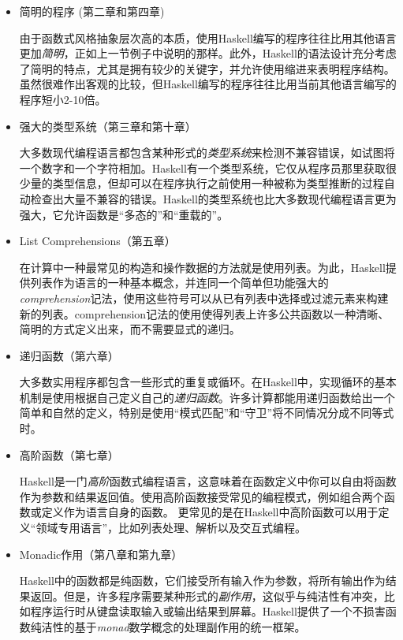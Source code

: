 \begin{itemize}
\item 简明的程序 (第二章和第四章)

由于函数式风格抽象层次高的本质，使用Haskell编写的程序往往比用其他语言更加\textit{简明}，正如上一节例子中说明的那样。此外，Haskell的语法设计充分考虑了简明的特点，尤其是拥有较少的关键字，并允许使用缩进来表明程序结构。虽然很难作出客观的比较，但Haskell编写的程序往往比用当前其他语言编写的程序短小2-10倍。

\item 强大的类型系统（第三章和第十章）

大多数现代编程语言都包含某种形式的\textit{类型系统}来检测不兼容错误，如试图将一个数字和一个字符相加。Haskell有一个类型系统，它仅从程序员那里获取很少量的类型信息，但却可以在程序执行之前使用一种被称为类型推断的过程自动检查出大量不兼容的错误。Haskell的类型系统也比大多数现代编程语言更为强大，它允许函数是“多态的”和“重载的”。

\item List Comprehensions（第五章）

在计算中一种最常见的构造和操作数据的方法就是使用列表。为此，Haskell提供列表作为语言的一种基本概念，并连同一个简单但功能强大的\textit{comprehension}记法，使用这些符号可以从已有列表中选择或过滤元素来构建新的列表。comprehension记法的使用使得列表上许多公共函数以一种清晰、简明的方式定义出来，而不需要显式的递归。

\item 递归函数（第六章）

大多数实用程序都包含一些形式的重复或循环。在Haskell中，实现循环的基本机制是使用根据自己定义自己的\textit{递归函数}。许多计算都能用递归函数给出一个简单和自然的定义，特别是使用“模式匹配”和“守卫”将不同情况分成不同等式时。

\item 高阶函数（第七章）

Haskell是一门\textit{高阶}函数式编程语言，这意味着在函数定义中你可以自由将函数作为参数和结果返回值。使用高阶函数接受常见的编程模式，例如组合两个函数或定义作为语言自身的函数。
更常见的是在Haskell中高阶函数可以用于定义“领域专用语言”，比如列表处理、解析以及交互式编程。

\item Monadic作用（第八章和第九章）

Haskell中的函数都是纯函数，它们接受所有输入作为参数，将所有输出作为结果返回。但是，许多程序需要某种形式的\textit{副作用}，这似乎与纯洁性有冲突，比如程序运行时从键盘读取输入或输出结果到屏幕。Haskell提供了一个不损害函数纯洁性的基于\textit{monad}数学概念的处理副作用的统一框架。


\end{itemize}
